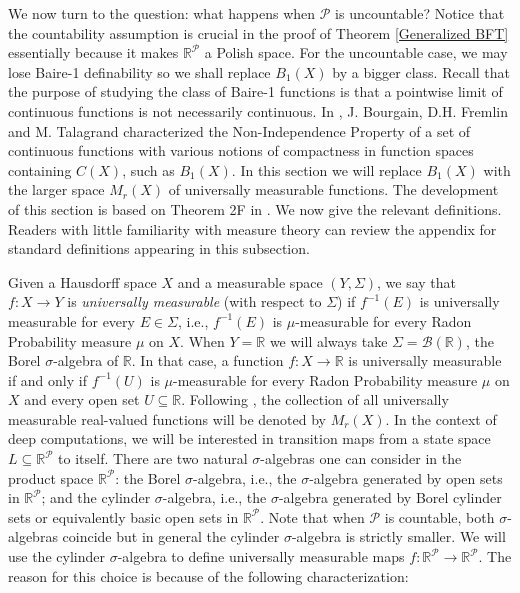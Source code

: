 \documentclass[psamsfonts]{amsart}
\theoremstyle{definition}
\theoremstyle{remark}
\numberwithin{equation}{section}
\begin{document}
We now turn to the question: what happens when $\mathcal{P}$ is uncountable? Notice that the countability assumption is crucial in the proof of Theorem \ref{Generalized BFT} essentially because it makes $\mathbb{R}^\mathcal{P}$ a Polish space. For the uncountable case, we may lose Baire-1 definability so we shall replace $B_1(X)$ by a bigger class. Recall that the purpose of studying the class of Baire-1 functions is that a pointwise limit of continuous functions is not necessarily continuous. In \cite{BFT_1978_PCompactBaire}, J. Bourgain, D.H. Fremlin and M. Talagrand characterized the Non-Independence Property of a set of continuous functions with various notions of compactness in function spaces containing $C(X)$, such as $B_1(X)$. In this section we will replace $B_1(X)$ with the larger space $M_r(X)$ of universally measurable functions. The development of this section is based on Theorem 2F in \cite{BFT_1978_PCompactBaire}. We now give the relevant definitions. Readers with little familiarity with measure theory can review the appendix for standard definitions appearing in this subsection.

Given a Hausdorff space $X$ and a measurable space $(Y,\Sigma)$, we say that $f:X\rightarrow Y$ is \emph{universally measurable} (with respect to $\Sigma$) if $f^{-1}(E)$ is universally measurable for every $E\in\Sigma$, i.e., $f^{-1}(E)$ is $\mu$-measurable for every Radon Probability measure $\mu$ on $X$. When $Y=\mathbb{R}$ we will always take $\Sigma=\mathcal{B}(\mathbb{R})$, the Borel $\sigma$-algebra of $\mathbb{R}$. In that case, a function $f:X\rightarrow\mathbb{R}$ is universally measurable if and only if $f^{-1}(U)$ is $\mu$-measurable for every Radon Probability measure $\mu$ on $X$ and every open set $U\subseteq\mathbb{R}$. Following \cite{BFT_1978_PCompactBaire}, the collection of all universally measurable real-valued functions will be denoted by $M_r(X)$. In the context of deep computations, we will be interested in transition maps from a state space $L\subseteq \mathbb{R}^\mathcal{P}$ to itself. There are two natural $\sigma$-algebras one can consider in the product space $\mathbb{R}^\mathcal{P}$: the Borel $\sigma$-algebra, i.e., the $\sigma$-algebra generated by open sets in $\mathbb{R}^\mathcal{P}$; and the cylinder $\sigma$-algebra, i.e., the $\sigma$-algebra generated by Borel cylinder sets or equivalently basic open sets in $\mathbb{R}^\mathcal{P}$. Note that when $\mathcal{P}$ is countable, both $\sigma$-algebras coincide but in general the cylinder $\sigma$-algebra is strictly smaller. We will use the cylinder $\sigma$-algebra to define universally measurable maps $f:\mathbb{R}^\mathcal{P}\rightarrow\mathbb{R}^\mathcal{P}$. The reason for this choice is because of the following characterization:
\end{document}
